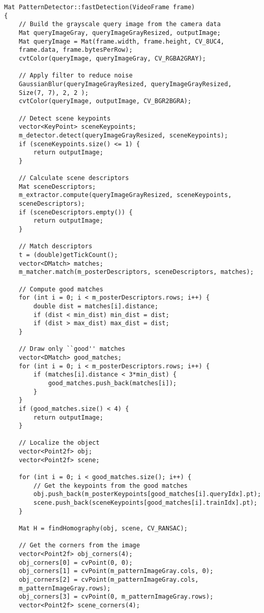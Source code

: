 \begin{verbatim}
Mat PatternDetector::fastDetection(VideoFrame frame)
{
    // Build the grayscale query image from the camera data
    Mat queryImageGray, queryImageGrayResized, outputImage;
    Mat queryImage = Mat(frame.width, frame.height, CV_8UC4,
    frame.data, frame.bytesPerRow);
    cvtColor(queryImage, queryImageGray, CV_RGBA2GRAY);

    // Apply filter to reduce noise
    GaussianBlur(queryImageGrayResized, queryImageGrayResized, 
    Size(7, 7), 2, 2 );
    cvtColor(queryImage, outputImage, CV_BGR2BGRA);
    
    // Detect scene keypoints
    vector<KeyPoint> sceneKeypoints;
    m_detector.detect(queryImageGrayResized, sceneKeypoints);
    if (sceneKeypoints.size() <= 1) {
        return outputImage;
    }
    
    // Calculate scene descriptors
    Mat sceneDescriptors;
    m_extractor.compute(queryImageGrayResized, sceneKeypoints,
    sceneDescriptors);
    if (sceneDescriptors.empty()) {
        return outputImage;
    }
    
    // Match descriptors
    t = (double)getTickCount();
    vector<DMatch> matches;
    m_matcher.match(m_posterDescriptors, sceneDescriptors, matches);

    // Compute good matches
    for (int i = 0; i < m_posterDescriptors.rows; i++) {
        double dist = matches[i].distance;
        if (dist < min_dist) min_dist = dist;
        if (dist > max_dist) max_dist = dist;
    }
    
    // Draw only ``good'' matches
    vector<DMatch> good_matches;
    for (int i = 0; i < m_posterDescriptors.rows; i++) {
        if (matches[i].distance < 3*min_dist) {
            good_matches.push_back(matches[i]);
        }
    }
    if (good_matches.size() < 4) {
        return outputImage;
    }
    
    // Localize the object
    vector<Point2f> obj;
    vector<Point2f> scene;
    
    for (int i = 0; i < good_matches.size(); i++) {
        // Get the keypoints from the good matches
        obj.push_back(m_posterKeypoints[good_matches[i].queryIdx].pt);
        scene.push_back(sceneKeypoints[good_matches[i].trainIdx].pt);
    }
    
    Mat H = findHomography(obj, scene, CV_RANSAC);
    
    // Get the corners from the image
    vector<Point2f> obj_corners(4);
    obj_corners[0] = cvPoint(0, 0);
    obj_corners[1] = cvPoint(m_patternImageGray.cols, 0);
    obj_corners[2] = cvPoint(m_patternImageGray.cols,
    m_patternImageGray.rows);
    obj_corners[3] = cvPoint(0, m_patternImageGray.rows);
    vector<Point2f> scene_corners(4);
    

\end{verbatim}
